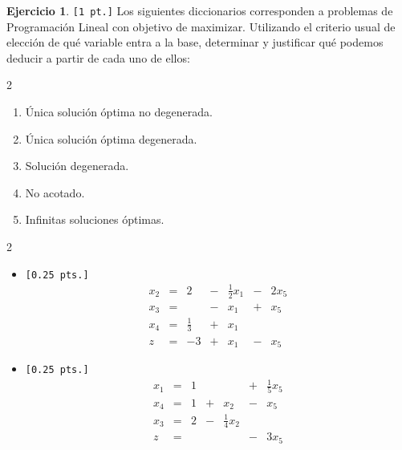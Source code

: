 \documentclass[a4paper,oneside,12pt]{amsart}
\theoremstyle{definition}
\newtheorem{quest}{Ejercicio}
\begin{document}


\begin{quest}
    \verb|[1 pt.]| Los siguientes diccionarios corresponden a problemas de Programación Lineal con
    objetivo de maximizar. Utilizando el criterio usual de elección de qué variable entra a la
    base, determinar y justificar qué podemos deducir a partir de cada uno de ellos:
    \begin{multicols}{2}
        \begin{enumerate}[label=\alph*)]
            \item Única solución óptima no degenerada.
            \item Única solución óptima degenerada.
            \item Solución degenerada.
            \item No acotado.
            \item Infinitas soluciones óptimas.
        \end{enumerate}
    \end{multicols}
    \begin{multicols}{2}
        \begin{itemize}
            \item[1)] \verb|[0.25 pts.]|
            \[
                \begin{array}{rrrrrrr}
                    x_2 & = & 2           & - & \frac{1}{2}x_1 & - & 2x_5            \\
                    x_3 & = &             & - & x_1            & + & x_5            \\
                    x_4 & = & \frac{1}{3} & + & x_1            &   &                \\ \hline
                    z   & = & -3          & + & x_1               & - & x_5
                \end{array}
            \]
            \item[3)] \verb|[0.25 pts.]|
            \[
                \begin{array}{rrrrrrr}
                    x_1 & = & 1 &   &                & + & \frac{1}{5}x_5 \\
                    x_4 & = & 1 & + & x_2            & - & x_5            \\
                    x_3 & = & 2 & - & \frac{1}{4}x_2 &   &                \\ \hline
                    z   & = &   &   &                & - & 3x_5

\end{array}\]
\end{itemize}
\end{multicols}
\end{quest}
\end{document}
